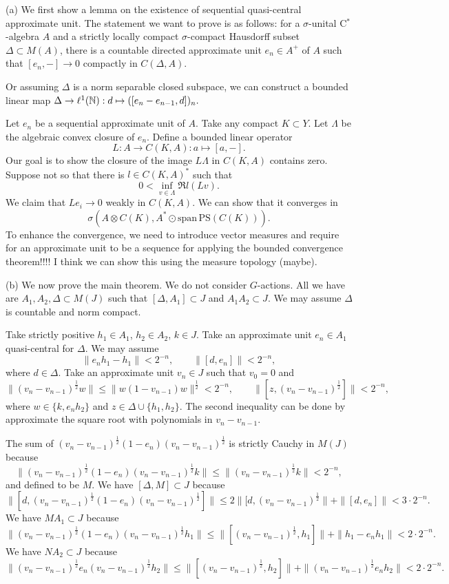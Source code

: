 \documentclass{../../large}
\begin{document}
\begin{pf}
(a)
We first show a lemma on the existence of sequential quasi-central approximate unit.
The statement we want to prove is as follows:
for a $\sigma$-unital C$^*$-algebra $A$ and a strictly locally compact $\sigma$-compact Hausdorff subset $\Delta\subset M(A)$, there is a countable directed approximate unit $e_n\in A^+$ of $A$ such that $[e_n,-]\to0$ compactly in $C(\Delta,A)$.

Or assuming $\Delta$ is a norm separable closed subspace, we can construct a bounded linear map $\Delta\to\ell^1(\mathbb{N}):d\mapsto([e_n-e_{n-1},d])_n.$

Let $e_n$ be a sequential approximate unit of $A$.
Take any compact $K\subset Y$.
Let $\Lambda$ be the algebraic convex closure of $e_n$.
Define a bounded linear operator
\[L:A\to C(K,A):a\mapsto[a,-].\]
Our goal is to show the closure of the image $L\Lambda$ in $C(K,A)$ contains zero.
Suppose not so that there is $l\in C(K,A)^*$ such that
\[0<\inf_{v\in\Lambda}\Re l(Lv).\]
We claim that $Le_i\to0$ weakly in $C(K,A)$.
We can show that it converges in
\[\sigma(A\otimes C(K),A^*\odot\mathrm{span}\,\mathrm{PS}(C(K))).\]
To enhance the convergence, we need to introduce vector measures and require for an approximate unit to be a sequence for applying the bounded convergence theorem!!!!
I think we can show this using the measure topology (maybe).

(b)
We now prove the main theorem.
We do not consider $G$-actions.
All we have are $A_1,A_2,\Delta\subset M(J)$ such that $[\Delta,A_1]\subset J$ and $A_1A_2\subset J$.
We may assume $\Delta$ is countable and norm compact.

Take strictly positive $h_1\in A_1$, $h_2\in A_2$, $k\in J$.
Take an approximate unit $e_n\in A_1$ quasi-central for $\Delta$.
We may assume
\[\|e_nh_1-h_1\|<2^{-n},\qquad\|[d,e_n]\|<2^{-n},\]
where $d\in\Delta$.
Take an approximate unit $v_n\in J$ such that $v_0=0$ and
\[\|(v_n-v_{n-1})^{\frac12}w\|\le\|w(1-v_{n-1})w\|^{\frac12}<2^{-n},\qquad\|[z,(v_n-v_{n-1})^{\frac12}]\|<2^{-n},\]
where $w\in\{k,e_nh_2\}$ and $z\in\Delta\cup\{h_1,h_2\}$.
The second inequality can be done by approximate the square root with polynomials in $v_n-v_{n-1}$.

The sum of $(v_n-v_{n-1})^{\frac12}(1-e_n)(v_n-v_{n-1})^{\frac12}$ is strictly Cauchy in $M(J)$ because
\[\|(v_n-v_{n-1})^{\frac12}(1-e_n)(v_n-v_{n-1})^{\frac12}k\|\le\|(v_n-v_{n-1})^{\frac12}k\|<2^{-n},\]
and defined to be $M$.
We have $[\Delta,M]\subset J$ because
\[\|[d,(v_n-v_{n-1})^{\frac12}(1-e_n)(v_n-v_{n-1})^{\frac12}]\|\le2\|[d,(v_n-v_{n-1})^{\frac12}\|+\|[d,e_n]\|<3\cdot2^{-n}.\]
We have $MA_1\subset J$ because
\[\|(v_n-v_{n-1})^{\frac12}(1-e_n)(v_n-v_{n-1})^{\frac12}h_1\|\le\|[(v_n-v_{n-1})^{\frac12},h_1]\|+\|h_1-e_nh_1\|<2\cdot2^{-n}.\]
We have $NA_2\subset J$ because
\[\|(v_n-v_{n-1})^{\frac12}e_n(v_n-v_{n-1})^{\frac12}h_2\|\le\|[(v_n-v_{n-1})^{\frac12},h_2]\|+\|(v_n-v_{n-1})^{\frac12}e_nh_2\|<2\cdot2^{-n}.\]
\end{pf}
\end{document}
